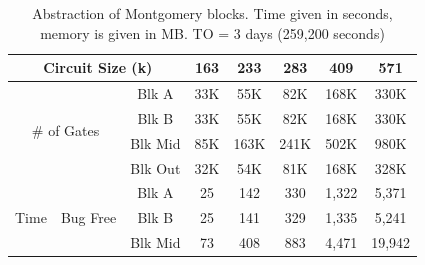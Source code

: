 \begin{table}[hbt]
\begin{center}
{\small
\caption{Abstraction of Montgomery blocks. Time given in seconds, memory is given in MB. TO = 3 days (259,200 seconds)}
\label{tbl:montBlkToolResults}
\begin{tabular}{|l|r|c|c|c|c|c|c|} 
\hline
\multicolumn{3}{|c|}{Circuit Size (k)}                          &    163 &      233 &     283 &     409 &     571 \\
\hline
\multicolumn{2}{|c|}{\multirow{4}{*}{\# of Gates}}    & Blk A   & 33K &   55K &  82K & 168K & 330K \\
\multicolumn{2}{|c|}{}                                & Blk B   & 33K &   55K &  82K & 168K & 330K \\
\multicolumn{2}{|c|}{}                                & Blk Mid & 85K &  163K & 241K & 502K & 980K \\
\multicolumn{2}{|c|}{}                                & Blk Out & 32K &   54K &  81K & 168K & 328K \\
\hline
\multirow{8}{*}{Time} &\multirow{4}{*}{Bug Free}& Blk A   &    25 &      142 &     330 &   1,322 &   5,371 \\
                      &                         & Blk B   &    25 &      141 &     329 &   1,335 &   5,241 \\
                      &                         & Blk Mid &    73 &      408 &     883 &   4,471 &  19,942 \\

\end{tabular}}
\end{center}
\end{table}
